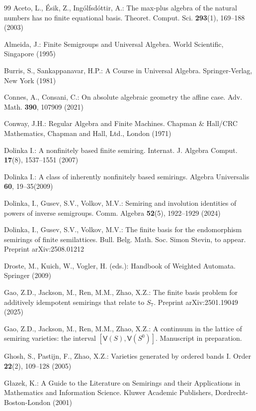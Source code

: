 \documentclass[reqno]{amsart}
\theoremstyle{plain}
\theoremstyle{definition}
\begin{document}
\begin{thebibliography}{99}
 Aceto, L., \'Esik, Z., Ing\'olfsd\'ottir, A.: The max-plus algebra of the natural numbers has no finite equational basis.
Theoret. Comput. Sci. \textbf{293}(1), 169--188 (2003)

Almeida, J.: Finite Semigroups and Universal Algebra. World Scientific, Singapore (1995)

Burris, S., Sankappanavar, H.P.: A Course in Universal Algebra. Springer-Verlag, New York (1981)

Connes, A., Consani, C.: On absolute algebraic geometry the affine case.
Adv. Math. {\bf 390}, 107909 (2021)

 Conway, J.H.: Regular Algebra and Finite Machines. Chapman \& Hall/CRC Mathematics, Chapman and Hall, Ltd., London (1971)

Dolinka I.: A nonfinitely based finite semiring. Internat. J. Algebra Comput. \textbf{17}(8), 1537--1551 (2007)

Dolinka I.: A class of inherently nonfinitely based semirings. Algebra Universalis \textbf{60}, 19--35(2009)

Dolinka, I., Gusev,  S.V., Volkov, M.V.:
Semiring and involution identities of powers of inverse semigroups.
Comm. Algebra \textbf{52}(5), 1922--1929 (2024)

Dolinka, I., Gusev,  S.V., Volkov, M.V.:
The finite basis for the endomorphism semirings of finite semilattices.
Bull. Belg. Math. Soc. Simon Stevin, to appear.
Preprint arXiv:2508.01212

Droste, M., Kuich, W., Vogler, H. (eds.): Handbook of Weighted Automata. Springer (2009)

Gao, Z.D., Jackson, M., Ren, M.M., Zhao, X.Z.:
The finite basis problem for additively idempotent semirings that relate to $S_7$.
Preprint arXiv:2501.19049 (2025)

Gao, Z.D., Jackson, M., Ren, M.M., Zhao, X.Z.:
A continuum in the lattice of semiring varieties: the interval $[\mathsf{V}(S), \mathsf{V}(S^0)]$.
Manuscript in preparation.

Ghosh, S., Pastijn, F., Zhao, X.Z.: Varieties generated by ordered bands I. Order
\textbf{22}(2), 109--128 (2005)

G{\l}azek, K.:
A Guide to the Literature on Semirings and their Applications in Mathematics and Information Science.
Kluwer Academic Publishers, Dordrecht-Boston-London (2001)


\end{thebibliography}
\end{document}
